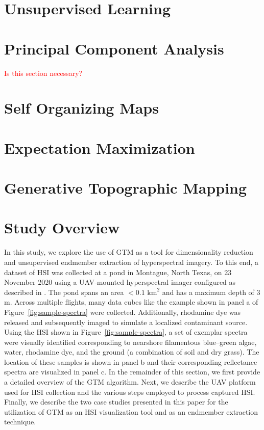\section{Unsupervised Learning}

\section{Principal Component Analysis}

\textcolor{red}{Is this section necessary?}

\section{Self Organizing Maps}

\section{Expectation Maximization}

\section{Generative Topographic Mapping}


\section{Study Overview}


In this study, we explore the use of  GTM as a tool for dimensionality reduction
and unsupervised endmember extraction of hyperspectral imagery. To this end, a
dataset of HSI was collected at a pond in Montague, North Texas, on 23 November
2020 using a UAV-mounted hyperspectral imager configured as described in
\cite{robot-team-1, robot-team-2}. The pond spans an area $<0.1$ $\text{km}^2$
and has a maximum depth of $3$ m. Across multiple flights, many data cubes like
the example shown in panel a of Figure~\ref{fig:sample-spectra} were collected.
Additionally, rhodamine dye was released and subsequently imaged to simulate a
localized contaminant source. Using the HSI shown in
Figure~\ref{fig:sample-spectra}, a set of exemplar spectra were visually
identified corresponding to nearshore filamentous blue--green algae, water,
rhodamine dye, and the ground (a combination of soil and dry grass). The
location of these samples is shown in panel b and their corresponding
reflectance spectra are visualized in panel c.  In the remainder of this
section, we first provide a detailed overview of the GTM algorithm. Next, we
describe the UAV platform used for HSI collection and the various steps employed
to process captured HSI. Finally, we describe the two case studies presented in
this paper for the utilization of  GTM as an HSI visualization tool and as an
endmember extraction technique.



